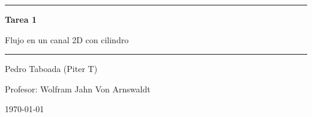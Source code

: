 \documentclass[11pt,a4paper]{article}
\renewcommand{\tareanum}{1}
\renewcommand{\tareatitulo}{Flujo en un canal 2D con cilindro}
\renewcommand{\alumno}{Pedro Taboada (Piter T)}
\renewcommand{\profesor}{Wolfram Jahn Von Arnswaldt}
\renewcommand{\fechaentrega}{\today}
\begin{document}
\begin{titlepage}
\centering
\vspace*{2cm}
{\Large\scshape \curso\par}
\vspace{0.5cm}
\rule{\textwidth}{0.8pt}\par
\vspace{0.8cm}
{\LARGE\bfseries Tarea \tareanum\par}
\vspace{0.4cm}
{\Large \tareatitulo\par}
\vspace{0.6cm}
\rule{\textwidth}{0.8pt}\par
\vspace{2cm}
{\large \alumno\par}
\vspace{0.3cm}
{\large Profesor: \profesor\par}

\vspace{0.5cm}
{\large \fechaentrega\par}
\end{titlepage}

\tableofcontents
\newpage


\end{document}
